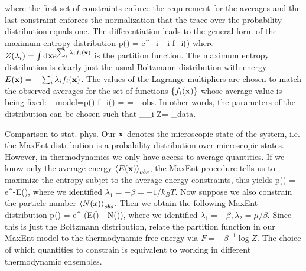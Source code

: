 where the first set of constraints enforce the requirement for the averages and the last constraint enforces the normalization that the trace over the probability distribution equals one. The differentiation leads to the general form of the maximum entropy distribution
\be 
p(\mx) =  e^{\sum_i \lambda_i f_i(\mx)}
\ee 
where $Z(\lambda_i)= \int \mathrm{d} \mathbf{x} e^{\sum_i \lambda_i f_i(\mathbf{x})}$ is the partition function. The maximum entropy distribution is clearly just the usual Boltzmann distribution with energy $E(\mathbf{x}) = - \sum_i \lambda_i f_i(\mathbf{x})$. The values of the Lagrange multipliers are chosen to match the observed averages for the set of functions $\{f_i(\mathbf{x})\}$ whose average value is being fixed:
\bse 
{}_{model}=\int \md \mx p(\mx) f_i(\mx) =  = _{obs}.
\ese 
In other words, the parameters of the distribution can be chosen such that 
\bse 
\partial_{\lambda_i} \log Z= _{data}.
\ese 
\begin{mybox}{Comparison to stat. phys.}
	Our $\mathbf{x}$ denotes the microscopic state of the system, i.e. the MaxEnt distribution is a probability distribution over microscopic states. However, in thermodynamics we only have access to average quantities. If we know only the average energy $\expval{E(\mathbf{x})}_{obs}$, the MaxEnt procedure tells us to maximize the entropy subjet to the average energy constraints, this yields
	\be 
	p(\mx) =  e^{-\beta E(\mx)},
	\ee 
	where we identified $\lambda_1 = - \beta= -1/k_BT$. Now suppose we also constrain the particle number $\expval{N(x)}_{obs}$. Then we obtain the following MaxEnt distribution
	\be 
	p(\mx) =  e^{-\beta (E(\mx) - \mu N(\mx))},
	\ee 
	where we identified $\lambda_1=-\beta, \lambda_2=\mu/\beta$. Since this is just the Boltzmann distribution,  relate the partition function in our MaxEnt model to the thermodynamic free-energy via $F=-\beta^{-1} \log Z$. The choice of which quantities to constrain is equivalent to working in different thermodynamic ensembles.
\end{mybox}
